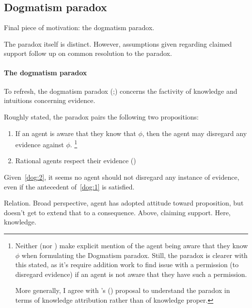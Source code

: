 \subsection{Dogmatism paradox}
\label{sec:dogmatism-paradox-wrt-assumption}

\begin{note}
  Final piece of motivation: the dogmatism paradox.

  The paradox itself is distinct.
  However, assumptions given regarding claimed support follow up on common resolution to the paradox.
\end{note}

\paragraph{The dogmatism paradox}

\begin{note}
  To refresh, the dogmatism paradox (\cite[39,43--45]{Kripke:2011wv};\cite[148]{Harman:1973ww}) concerns the factivity of knowledge and intuitions concerning evidence.

  Roughly stated, the paradox pairs the following two propositions:
  \begin{enumerate}[label=D\arabic*., ref=(D\arabic*)]
  \item\label{dog:1} If an agent is aware that they know that \(\phi\), then the agent may disregard any evidence against \(\phi\).\nolinebreak
    \footnote{
      Neither \citeauthor{Kripke:2011wv} (nor \citeauthor{Harman:1973ww}) make explicit mention of the agent being aware that they know \(\phi\) when formulating the Dogmatism paradox.
      Still, the paradox is clearer with this stated, as it's require addition work to find issue with a permission (to disregard evidence) if an agent is not aware that they have such a permission.

      More generally, I agree with \citeauthor{Zhaoqing:2015vj}'s (\Citeyear{Zhaoqing:2015vj}) proposal to understand the paradox in terms of knowledge attribution rather than of knowledge proper.
    }
  \item\label{dog:2} Rational agents respect their evidence
    (\cite[Cf.][\S2]{Kelly:2016wk})
  \end{enumerate}
  Given~\ref{dog:2}, it seems no agent should not disregard any instance of evidence, even if the antecedent of~\ref{dog:1} is satisfied.
\end{note}

\begin{note}
  Relation.
  Broad perspective, agent has adopted attitude toward proposition, but doesn't get to extend that to a consequence.
  Above, claiming support.
  Here, knowledge.
\end{note}

